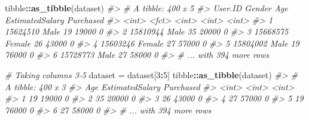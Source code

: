 \documentclass[]{book}
\newenvironment{Shaded}{\begin{snugshade}}{\end{snugshade}}
\newcommand{\CommentTok}[1]{\textcolor[rgb]{0.56,0.35,0.01}{\textit{#1}}}
\newcommand{\DataTypeTok}[1]{\textcolor[rgb]{0.13,0.29,0.53}{#1}}
\newcommand{\DecValTok}[1]{\textcolor[rgb]{0.00,0.00,0.81}{#1}}
\newcommand{\KeywordTok}[1]{\textcolor[rgb]{0.13,0.29,0.53}{\textbf{#1}}}
\newcommand{\NormalTok}[1]{#1}
\newcommand{\OperatorTok}[1]{\textcolor[rgb]{0.81,0.36,0.00}{\textbf{#1}}}
\newcommand{\StringTok}[1]{\textcolor[rgb]{0.31,0.60,0.02}{#1}}
\begin{document}
\begin{Shaded}
\begin{Highlighting}[]
\NormalTok{tibble}\OperatorTok{::}\KeywordTok{as_tibble}\NormalTok{(dataset)}
\CommentTok{#> # A tibble: 400 x 5}
\CommentTok{#>    User.ID Gender   Age EstimatedSalary Purchased}
\CommentTok{#>      <int> <fct>  <int>           <int>     <int>}
\CommentTok{#> 1 15624510 Male      19           19000         0}
\CommentTok{#> 2 15810944 Male      35           20000         0}
\CommentTok{#> 3 15668575 Female    26           43000         0}
\CommentTok{#> 4 15603246 Female    27           57000         0}
\CommentTok{#> 5 15804002 Male      19           76000         0}
\CommentTok{#> 6 15728773 Male      27           58000         0}
\CommentTok{#> # ... with 394 more rows}
\end{Highlighting}
\end{Shaded}

\begin{Shaded}
\begin{Highlighting}[]
\CommentTok{# Taking columns 3-5 }
\NormalTok{dataset =}\StringTok{ }\NormalTok{dataset[}\DecValTok{3}\OperatorTok{:}\DecValTok{5}\NormalTok{]}
\NormalTok{tibble}\OperatorTok{::}\KeywordTok{as_tibble}\NormalTok{(dataset)}
\CommentTok{#> # A tibble: 400 x 3}
\CommentTok{#>     Age EstimatedSalary Purchased}
\CommentTok{#>   <int>           <int>     <int>}
\CommentTok{#> 1    19           19000         0}
\CommentTok{#> 2    35           20000         0}
\CommentTok{#> 3    26           43000         0}
\CommentTok{#> 4    27           57000         0}
\CommentTok{#> 5    19           76000         0}
\CommentTok{#> 6    27           58000         0}
\CommentTok{#> # ... with 394 more rows}
\end{Highlighting}
\end{Shaded}

\begin{Shaded}
\end{Shaded}
\end{document}
